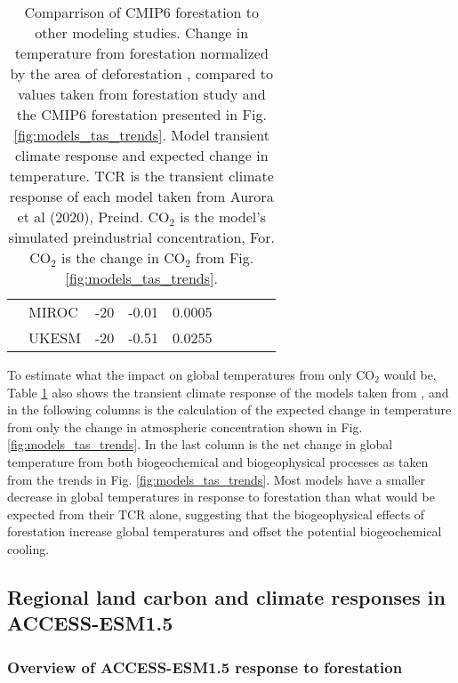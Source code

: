 \documentclass[]{article}
\begin{document}
\begin{table}[]
\begin{tabular}{ll|lllllll}
                     & MIROC         & -20          & -0.01     & 0.0005  &         &                   &                           &                                \\
                     & UKESM         & -20          & -0.51     & 0.0255  &         &                   &                           &                                \\ \hline
\end{tabular}
\caption{Comparrison of CMIP6 forestation to other modeling studies. Change in temperature from forestation normalized by the area of deforestation \parencite{boysen_global_2020}, compared to values taken from \parencite{sonntag_quantifying_2018} forestation study and the CMIP6 forestation presented in Fig. \ref{fig:models_tas_trends}. Model transient climate response and expected change in temperature. TCR is the transient climate response of each model taken from Aurora et al (2020), Preind. CO$_2$ is the model's simulated preindustrial concentration, For. CO$_2$ is the change in CO$_2$ from Fig. \ref{fig:models_tas_trends}.}
    \label{tab:normalized_temperature}
\end{table}

To estimate what the impact on global temperatures from only CO$_2$ would be, Table \ref{tab:normalized_temperature} also shows the transient climate response of the models taken from \cite{arora_carbonconcentration_2020}, and in the following columns is the calculation of the expected change in temperature from only the change in atmospheric concentration shown in Fig. \ref{fig:models_tas_trends}.
In the last column is the net change in global temperature from both biogeochemical and biogeophysical processes as taken from the trends in Fig. \ref{fig:models_tas_trends}.
Most models have a smaller decrease in global temperatures in response to forestation than what would be expected from their TCR alone, suggesting that the biogeophysical effects of forestation increase global temperatures and offset the potential biogeochemical cooling.

\subsection{Regional land carbon and climate responses in ACCESS-ESM1.5}

\subsubsection{Overview of ACCESS-ESM1.5 response to forestation}
\end{document}
